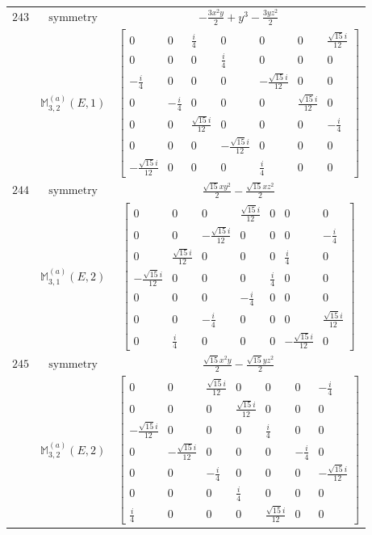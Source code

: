 \documentclass[fleqn,8pt,landscape]{jsarticle}
\begin{document}
\begin{longtable}{ccc}
$ 243 $ & $ \text{symmetry} $ & $ - \frac{3 x^{2} y}{2} + y^{3} - \frac{3 y z^{2}}{2} $ \\
$  $ & $ \mathbb{M}_{3,2}^{(a)}(E,1) $ & $ \begin{bmatrix} 0 & 0 & \frac{i}{4} & 0 & 0 & 0 & \frac{\sqrt{15} i}{12} \\ 0 & 0 & 0 & \frac{i}{4} & 0 & 0 & 0 \\ - \frac{i}{4} & 0 & 0 & 0 & - \frac{\sqrt{15} i}{12} & 0 & 0 \\ 0 & - \frac{i}{4} & 0 & 0 & 0 & \frac{\sqrt{15} i}{12} & 0 \\ 0 & 0 & \frac{\sqrt{15} i}{12} & 0 & 0 & 0 & - \frac{i}{4} \\ 0 & 0 & 0 & - \frac{\sqrt{15} i}{12} & 0 & 0 & 0 \\ - \frac{\sqrt{15} i}{12} & 0 & 0 & 0 & \frac{i}{4} & 0 & 0 \end{bmatrix} $ \\ \hline
$ 244 $ & $ \text{symmetry} $ & $ \frac{\sqrt{15} x y^{2}}{2} - \frac{\sqrt{15} x z^{2}}{2} $ \\
$  $ & $ \mathbb{M}_{3,1}^{(a)}(E,2) $ & $ \begin{bmatrix} 0 & 0 & 0 & \frac{\sqrt{15} i}{12} & 0 & 0 & 0 \\ 0 & 0 & - \frac{\sqrt{15} i}{12} & 0 & 0 & 0 & - \frac{i}{4} \\ 0 & \frac{\sqrt{15} i}{12} & 0 & 0 & 0 & \frac{i}{4} & 0 \\ - \frac{\sqrt{15} i}{12} & 0 & 0 & 0 & \frac{i}{4} & 0 & 0 \\ 0 & 0 & 0 & - \frac{i}{4} & 0 & 0 & 0 \\ 0 & 0 & - \frac{i}{4} & 0 & 0 & 0 & \frac{\sqrt{15} i}{12} \\ 0 & \frac{i}{4} & 0 & 0 & 0 & - \frac{\sqrt{15} i}{12} & 0 \end{bmatrix} $ \\ \hline
$ 245 $ & $ \text{symmetry} $ & $ \frac{\sqrt{15} x^{2} y}{2} - \frac{\sqrt{15} y z^{2}}{2} $ \\
$  $ & $ \mathbb{M}_{3,2}^{(a)}(E,2) $ & $ \begin{bmatrix} 0 & 0 & \frac{\sqrt{15} i}{12} & 0 & 0 & 0 & - \frac{i}{4} \\ 0 & 0 & 0 & \frac{\sqrt{15} i}{12} & 0 & 0 & 0 \\ - \frac{\sqrt{15} i}{12} & 0 & 0 & 0 & \frac{i}{4} & 0 & 0 \\ 0 & - \frac{\sqrt{15} i}{12} & 0 & 0 & 0 & - \frac{i}{4} & 0 \\ 0 & 0 & - \frac{i}{4} & 0 & 0 & 0 & - \frac{\sqrt{15} i}{12} \\ 0 & 0 & 0 & \frac{i}{4} & 0 & 0 & 0 \\ \frac{i}{4} & 0 & 0 & 0 & \frac{\sqrt{15} i}{12} & 0 & 0 \end{bmatrix} $ \\ \hline

\end{longtable}
\end{document}
